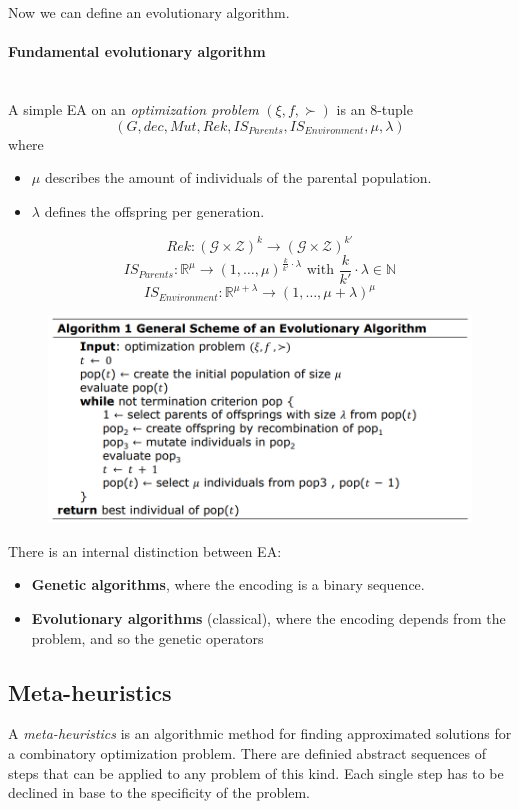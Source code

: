 \documentclass{article}
\begin{document}
Now we can define an evolutionary algorithm.
\paragraph{Fundamental evolutionary algorithm}\mbox{}\\
A simple EA on an \textit{optimization problem} $(\xi,f,\succ)$ is an 8-tuple
$$(G,dec,Mut,Rek,IS_{Parents},IS_{Environment},\mu,\lambda)$$
where
\begin{itemize}
    \item $\mu$ describes the amount of individuals of the parental population.
    \item $\lambda$ defines the offspring per generation.
\end{itemize}
$$Rek:(\mathcal{G}\times\mathcal{Z})^k\rightarrow(\mathcal{G}\times\mathcal{Z})^{k'}$$
$$IS_{Parents}:\mathbb{R}^\mu\rightarrow(1,\dots,\mu)^{\frac{k}{k'}\cdot\lambda}\text{ with }\frac{k}{k'}\cdot\lambda\in\mathbb{N}$$
$$IS_{Environment}:\mathbb{R}^{\mu+\lambda}\rightarrow(1,\dots,\mu+\lambda)^\mu$$
\begin{figure}[H]
    \centering
    \includegraphics[scale=0.5]{images/gen-scheme-ea.png}
\end{figure}
There is an internal distinction between EA:
\begin{itemize}
    \item \textbf{Genetic algorithms}, where the encoding is a binary sequence.
    \item \textbf{Evolutionary algorithms} (classical), where the encoding depends
          from the problem, and so the genetic operators
\end{itemize}

\subsection{Meta-heuristics}
A \textit{meta-heuristics} is an algorithmic method for finding approximated solutions for a
combinatory optimization problem. There are definied abstract sequences of steps that can be applied
to any problem of this kind. Each single step has to be declined in base to the specificity of the problem.
\end{document}
